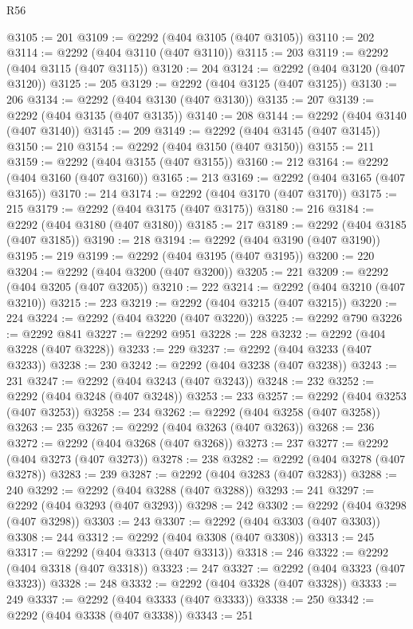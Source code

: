 \begin{lexlean}{R56}
\begin{coremodule}
@3105 := 201
@3109 := @2292 (@404 @3105 (@407 @3105))
@3110 := 202
@3114 := @2292 (@404 @3110 (@407 @3110))
@3115 := 203
@3119 := @2292 (@404 @3115 (@407 @3115))
@3120 := 204
@3124 := @2292 (@404 @3120 (@407 @3120))
@3125 := 205
@3129 := @2292 (@404 @3125 (@407 @3125))
@3130 := 206
@3134 := @2292 (@404 @3130 (@407 @3130))
@3135 := 207
@3139 := @2292 (@404 @3135 (@407 @3135))
@3140 := 208
@3144 := @2292 (@404 @3140 (@407 @3140))
@3145 := 209
@3149 := @2292 (@404 @3145 (@407 @3145))
@3150 := 210
@3154 := @2292 (@404 @3150 (@407 @3150))
@3155 := 211
@3159 := @2292 (@404 @3155 (@407 @3155))
@3160 := 212
@3164 := @2292 (@404 @3160 (@407 @3160))
@3165 := 213
@3169 := @2292 (@404 @3165 (@407 @3165))
@3170 := 214
@3174 := @2292 (@404 @3170 (@407 @3170))
@3175 := 215
@3179 := @2292 (@404 @3175 (@407 @3175))
@3180 := 216
@3184 := @2292 (@404 @3180 (@407 @3180))
@3185 := 217
@3189 := @2292 (@404 @3185 (@407 @3185))
@3190 := 218
@3194 := @2292 (@404 @3190 (@407 @3190))
@3195 := 219
@3199 := @2292 (@404 @3195 (@407 @3195))
@3200 := 220
@3204 := @2292 (@404 @3200 (@407 @3200))
@3205 := 221
@3209 := @2292 (@404 @3205 (@407 @3205))
@3210 := 222
@3214 := @2292 (@404 @3210 (@407 @3210))
@3215 := 223
@3219 := @2292 (@404 @3215 (@407 @3215))
@3220 := 224
@3224 := @2292 (@404 @3220 (@407 @3220))
@3225 := @2292 @790
@3226 := @2292 @841
@3227 := @2292 @951
@3228 := 228
@3232 := @2292 (@404 @3228 (@407 @3228))
@3233 := 229
@3237 := @2292 (@404 @3233 (@407 @3233))
@3238 := 230
@3242 := @2292 (@404 @3238 (@407 @3238))
@3243 := 231
@3247 := @2292 (@404 @3243 (@407 @3243))
@3248 := 232
@3252 := @2292 (@404 @3248 (@407 @3248))
@3253 := 233
@3257 := @2292 (@404 @3253 (@407 @3253))
@3258 := 234
@3262 := @2292 (@404 @3258 (@407 @3258))
@3263 := 235
@3267 := @2292 (@404 @3263 (@407 @3263))
@3268 := 236
@3272 := @2292 (@404 @3268 (@407 @3268))
@3273 := 237
@3277 := @2292 (@404 @3273 (@407 @3273))
@3278 := 238
@3282 := @2292 (@404 @3278 (@407 @3278))
@3283 := 239
@3287 := @2292 (@404 @3283 (@407 @3283))
@3288 := 240
@3292 := @2292 (@404 @3288 (@407 @3288))
@3293 := 241
@3297 := @2292 (@404 @3293 (@407 @3293))
@3298 := 242
@3302 := @2292 (@404 @3298 (@407 @3298))
@3303 := 243
@3307 := @2292 (@404 @3303 (@407 @3303))
@3308 := 244
@3312 := @2292 (@404 @3308 (@407 @3308))
@3313 := 245
@3317 := @2292 (@404 @3313 (@407 @3313))
@3318 := 246
@3322 := @2292 (@404 @3318 (@407 @3318))
@3323 := 247
@3327 := @2292 (@404 @3323 (@407 @3323))
@3328 := 248
@3332 := @2292 (@404 @3328 (@407 @3328))
@3333 := 249
@3337 := @2292 (@404 @3333 (@407 @3333))
@3338 := 250
@3342 := @2292 (@404 @3338 (@407 @3338))
@3343 := 251

\end{coremodule}
\end{lexlean}
